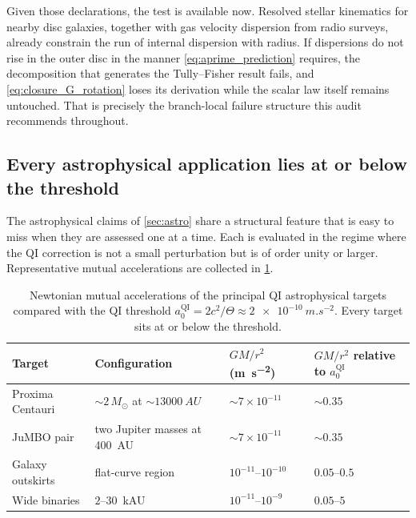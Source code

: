 \documentclass[11pt]{article}
\newcommand{\QI}{\mathrm{QI}}
\begin{document}
Given those declarations, the test is available now. Resolved stellar kinematics for nearby disc galaxies, together with gas velocity dispersion from radio surveys, already constrain the run of internal dispersion with radius. If dispersions do not rise in the outer disc in the manner \cref{eq:aprime_prediction} requires, the decomposition that generates the Tully--Fisher result fails, and \cref{eq:closure_G_rotation} loses its derivation while the scalar law itself remains untouched. That is precisely the branch-local failure structure this audit recommends throughout.

\subsection{Every astrophysical application lies at or below the threshold}
\label{sec:subthreshold}

The astrophysical claims of \cref{sec:astro} share a structural feature that is easy to miss when they are assessed one at a time. Each is evaluated in the regime where the QI correction is not a small perturbation but is of order unity or larger. Representative mutual accelerations are collected in \cref{tab:subthreshold}.

\begin{table}[H]
\centering
\caption{Newtonian mutual accelerations of the principal QI astrophysical targets compared with the QI threshold \(a_{0}^{\QI}=2c^{2}/\Theta\approx\SI{2e-10}{m.s^{-2}}\). Every target sits at or below the threshold.}
\label{tab:subthreshold}
\begin{tabularx}{\textwidth}{>{\raggedright\arraybackslash}p{}>{\raggedright\arraybackslash}p{}>{\raggedright\arraybackslash}p{}X}
\toprule
Target & Configuration & \(GM/r^{2}\) (\si{m.s^{-2}}) & \(GM/r^{2}\) relative to \(a_{0}^{\QI}\) \\
\midrule
Proxima Centauri & \(\sim2\,M_{\odot}\) at \(\sim\SI{13000}{AU}\) & \(\sim7\times10^{-11}\) & \(\sim0.35\) \\
JuMBO pair & two Jupiter masses at \SI{400}{AU} & \(\sim7\times10^{-11}\) & \(\sim0.35\) \\
Galaxy outskirts & flat-curve region & \(10^{-11}\)--\(10^{-10}\) & \(0.05\)--\(0.5\) \\
Wide binaries & \(2\)--\SI{30}{kAU} & \(10^{-11}\)--\(10^{-9}\) & \(0.05\)--\(5\) \\
\bottomrule
\end{tabularx}
\end{table}
\end{document}
